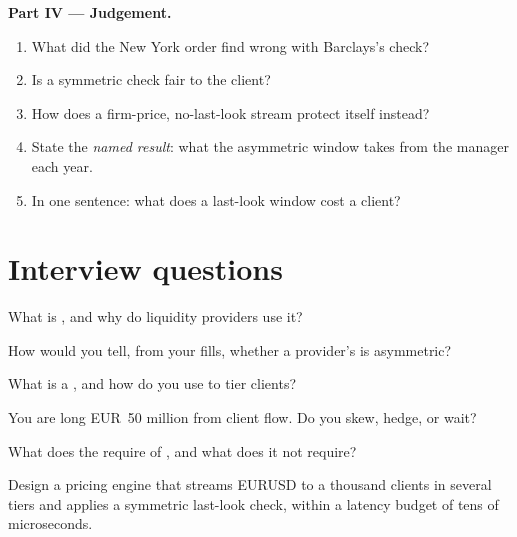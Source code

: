 \begin{problem}
\medskip\noindent\textbf{Part IV --- Judgement.}
\begin{enumerate}[resume]
\item What did the New York order find wrong with Barclays's check?
\item Is a symmetric check fair to the client?
\item How does a firm-price, no-last-look stream protect itself instead?
\item State the \emph{named result}: what the asymmetric window takes from the
manager each year.
\item In one sentence: what does a last-look window cost a client?
\end{enumerate}
\end{problem}

\section{Interview questions}

\begin{interviewq}\label{iq:m2:fx-spot-microstructure:1}
What is , and why do liquidity providers use it?
\end{interviewq}

\begin{interviewq}\label{iq:m2:fx-spot-microstructure:2}
How would you tell, from your fills, whether a provider's  is
asymmetric?
\end{interviewq}

\begin{interviewq}\label{iq:m2:fx-spot-microstructure:3}
What is a , and how do you use  to tier clients?
\end{interviewq}

\begin{interviewq}\label{iq:m2:fx-spot-microstructure:4}
You are long EUR~50 million from client flow. Do you skew, hedge, or wait?
\end{interviewq}

\begin{interviewq}\label{iq:m2:fx-spot-microstructure:5}
What does the  require of , and what does it not
require?
\end{interviewq}

\begin{interviewq}\label{iq:m2:fx-spot-microstructure:6}
Design a pricing engine that streams EURUSD to a thousand clients in several
tiers and applies a symmetric last-look check, within a latency budget of tens
of microseconds.
\end{interviewq}
